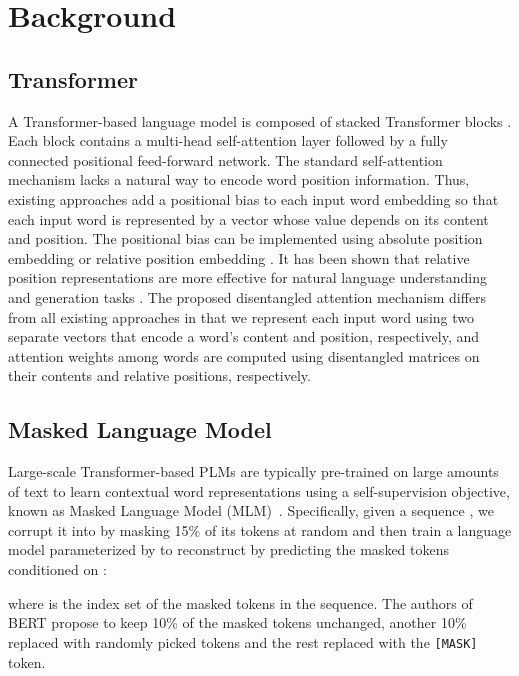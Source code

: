 \documentclass{article}
\begin{document}
 
\section{Background}
\subsection{Transformer}
A Transformer-based language model is composed of stacked Transformer blocks \citep{vaswani2017attention}.
Each block contains a multi-head self-attention layer followed by a fully connected positional feed-forward network. 
The standard self-attention mechanism lacks a natural way to encode word position information.  
Thus, existing approaches add  a positional bias to each input word embedding so that each input word is represented by a vector whose value depends on its content and position.
The positional bias can be implemented using absolute position embedding \citep{vaswani2017attention,radford2019language,devlin2018bert} or relative position embedding \citep{huang2018music,yang2019xlnet}.
It has been shown that relative position representations are more effective for natural language understanding and generation tasks \citep{dai2019transformer,shaw2018self}.
The proposed disentangled attention mechanism differs from all existing approaches in that we represent each input word using two separate vectors that encode a word's content and position, respectively, and attention weights among words are computed using disentangled matrices on their contents and relative positions, respectively. 




\subsection{Masked Language Model}



Large-scale Transformer-based PLMs 
are typically pre-trained on large amounts of text to learn contextual word representations using a self-supervision objective, known as Masked Language Model (MLM)~\citep{devlin2018bert}. Specifically, given a sequence , we corrupt it into  by masking 15\% of its tokens at random and then train a language model parameterized by  to reconstruct  by predicting the masked tokens  conditioned on : 

where  is the index set of the masked tokens in the sequence. The authors of BERT propose to keep 10\% of the masked tokens unchanged, another 10\% replaced with randomly picked tokens and the rest replaced with the \texttt{[MASK]} token.
\end{document}
